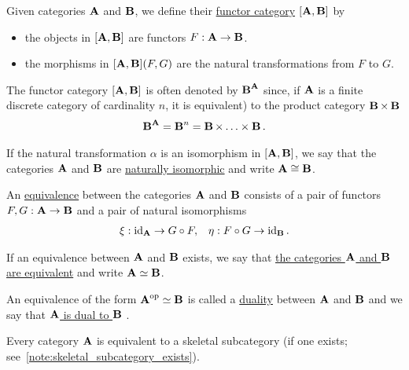\begin{definition}\label{def:functor_category}
  Given categories $\operatorname{\mathbf{A}}$ and $\operatorname{\mathbf{B}}$, we define their \uline{functor category} $[\operatorname{\mathbf{A}}, \operatorname{\mathbf{B}}]$ by
  \begin{itemize}
    \item the objects in $[\operatorname{\mathbf{A}}, \operatorname{\mathbf{B}}]$ are functors $F: \operatorname{\mathbf{A}} \to \operatorname{\mathbf{B}}$.
    \item the morphisms in $[\operatorname{\mathbf{A}}, \operatorname{\mathbf{B}}](F, G)$ are the natural transformations from $F$ to $G$.
  \end{itemize}

  The functor category $[\operatorname{\mathbf{A}}, \operatorname{\mathbf{B}}]$ is often denoted by ${\operatorname{\mathbf{B}}}^{\operatorname{\mathbf{A}}}$ since, if $\operatorname{\mathbf{A}}$ is a finite discrete category of cardinality $n$, it is equivalent) to the product category $\operatorname{\mathbf{B}} \times \operatorname{\mathbf{B}}$
  \begin{align*}
    {\operatorname{\mathbf{B}}}^{\operatorname{\mathbf{A}}} = {\operatorname{\mathbf{B}}}^n = \operatorname{\mathbf{B}} \times \ldots \times \operatorname{\mathbf{B}}.
  \end{align*}

  If the natural transformation $\alpha$ is an isomorphism in $[\operatorname{\mathbf{A}}, \operatorname{\mathbf{B}}]$, we say that the categories $\operatorname{\mathbf{A}}$ and $\operatorname{\mathbf{B}}$ are \uline{naturally isomorphic} and write $\operatorname{\mathbf{A}} \cong \operatorname{\mathbf{B}}$.
\end{definition}

\begin{definition}\label{def:category_equivalence}\cite[definition 1.3.15]{Leinster2014}
  An \uline{equivalence} between the categories $\operatorname{\mathbf{A}}$ and $\operatorname{\mathbf{B}}$ consists of a pair of functors $F, G: \operatorname{\mathbf{A}} \to \operatorname{\mathbf{B}}$ and a pair of natural isomorphisms
  \begin{align*}
    \xi: \operatorname{id}_{\operatorname{\mathbf{A}}} \to G \circ F,
    &&
    \eta: F \circ G \to \operatorname{id}_{\operatorname{\mathbf{B}}}.
  \end{align*}

  If an equivalence between $\operatorname{\mathbf{A}}$ and $\operatorname{\mathbf{B}}$ exists, we say that \uline{the categories $\operatorname{\mathbf{A}}$ and $\operatorname{\mathbf{B}}$ are equivalent} and write $\operatorname{\mathbf{A}} \simeq \operatorname{\mathbf{B}}$.

  An equivalence of the form $\operatorname{\mathbf{A}}^{\operatorname{op}} \simeq \operatorname{\mathbf{B}}$ is called a \uline{duality} between $\operatorname{\mathbf{A}}$ and $\operatorname{\mathbf{B}}$ and we say that \uline{$\operatorname{\mathbf{A}}$ is dual to $\operatorname{\mathbf{B}}$} \cite[example 1.3.22]{Leinster2014}.
\end{definition}

\begin{proposition}\label{thm:skeletal_subcategory_equivalence}\cite[91]{MacLane1994}
  Every category $\operatorname{\mathbf{A}}$ is equivalent to a skeletal subcategory (if one exists; see~\cref{note:skeletal_subcategory_exists}).
\end{proposition}

